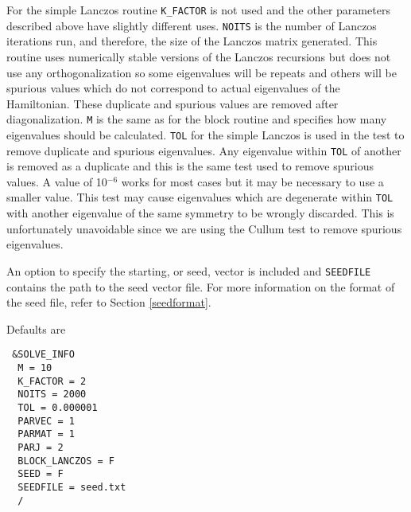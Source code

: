 \documentclass{article}
\begin{document}
For the simple Lanczos routine {\tt K\_FACTOR} is not used and the other parameters described above
have slightly different uses. {\tt NOITS} is the number of Lanczos iterations run, and therefore, the
size of the Lanczos matrix generated. This routine uses numerically stable versions of the Lanczos recursions\cite{cullum} but does not use any orthogonalization so some
eigenvalues will be repeats and others will be spurious values which do not correspond to actual
eigenvalues of the Hamiltonian. These duplicate and spurious values are removed after diagonalization. {\tt M} is the same as for the block routine and specifies how many eigenvalues should be calculated. {\tt TOL} for the simple Lanczos is used
in the test to remove duplicate and spurious eigenvalues. Any eigenvalue within {\tt TOL} of another
is removed as a duplicate and this is the same test used to remove spurious values. A value
of 10$^{-6}$ works for most cases but it may be necessary to use a smaller value. This test may cause eigenvalues which are degenerate within {\tt TOL} with another eigenvalue of the same symmetry to be wrongly discarded. This is unfortunately unavoidable since we are using the Cullum test to remove spurious eigenvalues.

An option to specify the starting, or seed, vector is included and \texttt{SEEDFILE} contains the path to the seed vector file. For more information on the format of the seed file, refer to Section \ref{seedformat}.

Defaults are

\begin{verbatim}
 &SOLVE_INFO
  M = 10
  K_FACTOR = 2
  NOITS = 2000
  TOL = 0.000001
  PARVEC = 1
  PARMAT = 1
  PARJ = 2
  BLOCK_LANCZOS = F
  SEED = F
  SEEDFILE = seed.txt
  /
\end{verbatim}
\end{document}
